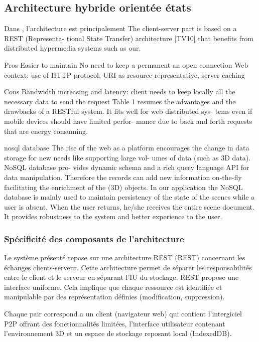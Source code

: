 \subsection{Architecture hybride \og orientée états\fg{}}
\label{sec:comm_state}

Dans \cite{Desprat2015a,Desprat2015b}, l'architecture est principalement 
The client-server part is based on a REST (Representa- tional State Transfer) 
architecture [TV10] that benefits from distributed hypermedia systems such as 
our. 


Pros
Easier to maintain
No need to keep a permanent an open connection
Web context: use of HTTP protocol, URI as resource representative, server 
caching


Cons
Bandwidth increasing and latency: client needs to keep locally all the necessary 
data to send the request
  Table 1 resumes the advantages and the drawbacks of a RESTful system. It fits 
  well for web distributed sys- tems even if mobile devices should have limited 
  perfor- mance due to back and forth requests that are energy consuming.
  

nosql database
The rise of the web as a platform encourages the change in data storage for new 
needs like supporting large vol- umes of data (such as 3D data). NoSQL database 
pro- vides dynamic schema and a rich query language API
for data manipulation. Therefore the records can add new information on-the-fly 
facilitating the enrichment of the (3D) objects. In our application the NoSQL 
database is mainly used to maintain persistency of the state of the scenes while a 
user is absent. When the user returns, he/she receives the entire scene 
document. It provides robustness to the system and better experience to the user.

\subsubsection{Spécificité des composants de l'architecture}
Le système présenté repose sur une architecture \acrshort{REST} 
(\acrlong{REST}) concernant les échanges clients-serveur. Cette architecture 
permet de séparer les responsabilités entre le client et le serveur en séparant 
l'\gls{IU} du stockage. \gls{REST} propose une interface uniforme. Cela implique 
que chaque ressource est identifiée et manipulable par des représentation définies 
(modification, suppression). 

Chaque pair correspond a un client (navigateur web) qui contient l'intergiciel 
\gls{P2P} offrant des fonctionnalités limitées, l'interface utilisateur contenant 
l'environnement 3D et un espace de stockage reposant local (IndexedDB).


